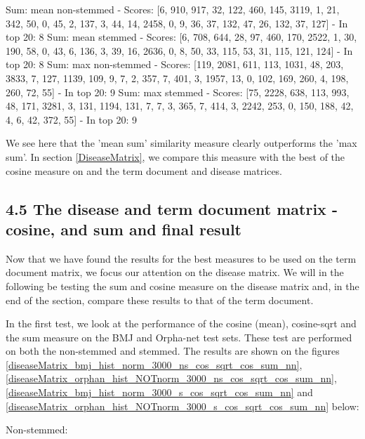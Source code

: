 Sum: mean non-stemmed - Scores: [6, 910, 917, 32, 122, 460, 145, 3119, 1, 21, 342, 50, 0, 45, 2, 137, 3, 44, 14, 2458, 0, 9, 36, 37, 132, 47, 26, 132, 37, 127] - In top 20: 8
Sum: mean stemmed - Scores: [6, 708, 644, 28, 97, 460, 170, 2522, 1, 30, 190, 58, 0, 43, 6, 136, 3, 39, 16, 2636, 0, 8, 50, 33, 115, 53, 31, 115, 121, 124] - In top 20: 8
Sum: max non-stemmed - Scores: [119, 2081, 611, 113, 1031, 48, 203, 3833, 7, 127, 1139, 109, 9, 7, 2, 357, 7, 401, 3, 1957, 13, 0, 102, 169, 260, 4, 198, 260, 72, 55] - In top 20: 9
Sum: max stemmed - Scores: [75, 2228, 638, 113, 993, 48, 171, 3281, 3, 131, 1194, 131, 7, 7, 3, 365, 7, 414, 3, 2242, 253, 0, 150, 188, 42, 4, 6, 42, 372, 55] - In top 20: 9

We see here that the 'mean sum' similarity measure clearly outperforms the 'max sum'. In section \ref{DiseaseMatrix}, we compare this measure with the best of the cosine measure on and the term document and disease matrices.

\subsection{4.5 The disease and term document matrix - cosine,  and sum and final result}

Now that we have found the results for the best measures to be used on the term document matrix, we focus our attention on the disease matrix. We will in the following be testing the sum and cosine measure on the disease matrix and, in the end of the section, compare these results to that of the term document.

In the first test, we look at the performance of the cosine (mean), cosine-sqrt and the sum measure on the BMJ and Orpha-net test sets. These test are performed on both the non-stemmed and stemmed. The results are shown on the figures \ref{diseaseMatrix_bmj_hist_norm_3000_ns_cos_sqrt_cos_sum_nn}, \ref{diseaseMatrix_orphan_hist_NOTnorm_3000_ns_cos_sqrt_cos_sum_nn}, \ref{diseaseMatrix_bmj_hist_norm_3000_s_cos_sqrt_cos_sum_nn} and \ref{diseaseMatrix_orphan_hist_NOTnorm_3000_s_cos_sqrt_cos_sum_nn} below:

Non-stemmed:

